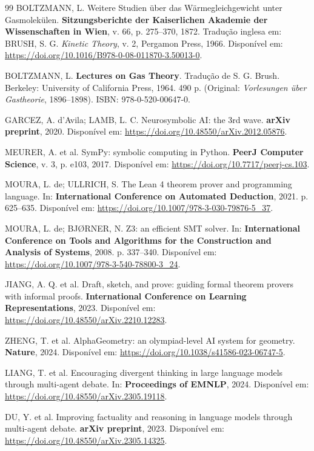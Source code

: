 \documentclass[5p]{elsarticle}
\theoremstyle{remark}
\begin{document}
\begin{thebibliography}{99}
BOLTZMANN, L. Weitere Studien über das Wärmegleichgewicht unter Gasmolekülen. \textbf{Sitzungsberichte der Kaiserlichen Akademie der Wissenschaften in Wien}, v. 66, p. 275--370, 1872. Tradução inglesa em: BRUSH, S. G. \textit{Kinetic Theory}, v. 2, Pergamon Press, 1966. Disponível em: \url{https://doi.org/10.1016/B978-0-08-011870-3.50013-0}.

BOLTZMANN, L. \textbf{Lectures on Gas Theory}. Tradução de S. G. Brush. Berkeley: University of California Press, 1964. 490 p. (Original: \textit{Vorlesungen über Gastheorie}, 1896--1898). ISBN: 978-0-520-00647-0.

GARCEZ, A. d'Avila; LAMB, L. C. Neurosymbolic AI: the 3rd wave. \textbf{arXiv preprint}, 2020. Disponível em: \url{https://doi.org/10.48550/arXiv.2012.05876}.

MEURER, A. et al. SymPy: symbolic computing in Python. \textbf{PeerJ Computer Science}, v. 3, p. e103, 2017. Disponível em: \url{https://doi.org/10.7717/peerj-cs.103}.

MOURA, L. de; ULLRICH, S. The Lean 4 theorem prover and programming language. In: \textbf{International Conference on Automated Deduction}, 2021. p. 625--635. Disponível em: \url{https://doi.org/10.1007/978-3-030-79876-5_37}.

MOURA, L. de; BJØRNER, N. Z3: an efficient SMT solver. In: \textbf{International Conference on Tools and Algorithms for the Construction and Analysis of Systems}, 2008. p. 337--340. Disponível em: \url{https://doi.org/10.1007/978-3-540-78800-3_24}.

JIANG, A. Q. et al. Draft, sketch, and prove: guiding formal theorem provers with informal proofs. \textbf{International Conference on Learning Representations}, 2023. Disponível em: \url{https://doi.org/10.48550/arXiv.2210.12283}.

ZHENG, T. et al. AlphaGeometry: an olympiad-level AI system for geometry. \textbf{Nature}, 2024. Disponível em: \url{https://doi.org/10.1038/s41586-023-06747-5}.

LIANG, T. et al. Encouraging divergent thinking in large language models through multi-agent debate. In: \textbf{Proceedings of EMNLP}, 2024. Disponível em: \url{https://doi.org/10.48550/arXiv.2305.19118}.

DU, Y. et al. Improving factuality and reasoning in language models through multi-agent debate. \textbf{arXiv preprint}, 2023. Disponível em: \url{https://doi.org/10.48550/arXiv.2305.14325}.


\end{thebibliography}
\end{document}
